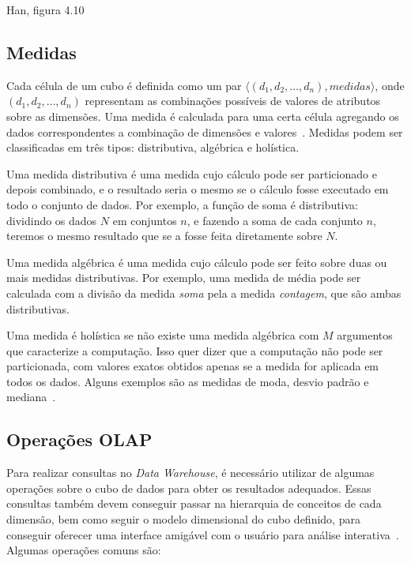 {\color{red} Han, figura 4.10}

\subsection{Medidas}\label{ch:fun:cube:measures}

Cada célula de um cubo é definida como um par $\langle (d_1, d_2, \ldots, d_n), medidas\rangle$, onde $(d_1, d_2, \ldots, d_n)$ representam as combinações possíveis de valores de atributos sobre as dimensões.
Uma medida é calculada para uma certa célula agregando os dados correspondentes a combinação de dimensões e valores~\cite{hanDataMiningConcepts2011}.
Medidas podem ser classificadas em três tipos: distributiva, algébrica e holística.

Uma medida distributiva é uma medida cujo cálculo pode ser particionado e depois combinado, e o resultado seria o mesmo se o cálculo fosse executado em todo o conjunto de dados.
Por exemplo, a função de soma é distributiva: dividindo os dados $N$ em conjuntos $n$, e fazendo a soma de cada conjunto $n$, teremos o mesmo resultado que se a fosse feita diretamente sobre $N$.

Uma medida algébrica é uma medida cujo cálculo pode ser feito sobre duas ou mais medidas distributivas.
Por exemplo, uma medida de média pode ser calculada com a divisão da medida \textit{soma} pela a medida \textit{contagem}, que são ambas distributivas.

Uma medida é holística se não existe uma medida algébrica com $M$ argumentos que caracterize a computação.
Isso quer dizer que a computação não pode ser particionada, com valores exatos obtidos apenas se a medida for aplicada em todos os dados.
Alguns exemplos são as medidas de moda, desvio padrão e mediana~\cite{hanDataMiningConcepts2011}.

\subsection{Operações OLAP}\label{ch:fun:cube:olapops}

Para realizar consultas no \textit{Data Warehouse}, é necessário utilizar de algumas operações sobre o cubo de dados para obter os resultados adequados.
Essas consultas também devem conseguir passar na hierarquia de conceitos de cada dimensão, bem como seguir o modelo dimensional do cubo definido, para conseguir oferecer uma interface amigável com o usuário para análise interativa~\cite{hanDataMiningConcepts2011}.
Algumas operações comuns são:

